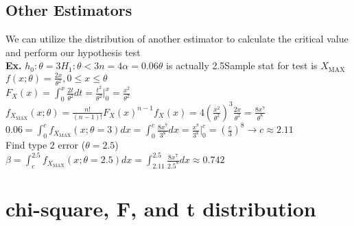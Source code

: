 \documentclass{article}
\begin{document}
\subsection{Other Estimators}
\label{sec:hother}
We can utilize the distribution of another estimator to calculate the critical value and perform our hypothesis test\\
\textbf{Ex.} $h_0:\theta=3$\hspace*{0.2in}$H_1:\theta<3$\hspace*{0.2in}$n=4$\hspace*{0.2in}$\alpha=0.06$\hspace*{0.2in}$\theta$ is actually 2.5\hspace*{0.2in}Sample stat for test is $X_{\text{MAX}}$\\
$f(x;\theta)=\frac{2x}{\theta^2},0\leq x\leq \theta$\\
$F_X(x)=\int_0^x\frac{2t}{\theta^2}dt=\frac{t^2}{\theta^2}\big \vert_0^x=\frac{x^2}{\theta^2}$\\
$f_{X_\text{MAX}}(x;\theta)=\frac{n!}{(n-1)!}F_X(x)^{n-1}f_X(x)=4(\frac{x^2}{\theta^2})^3\frac{2x}{\theta^2}=\frac{8x^7}{\theta^8}$\\
$0.06=\int_0^cf_{X_\text{MAX}}(x;\theta=3)dx=\int_0^c\frac{8x^7}{3^8}dx=\frac{x^8}{3^8}\big\vert_0^c=(\frac{c}{3})^8\rightarrow c\approx 2.11$\\
Find type 2 error ($\theta=2.5$)\\
$\beta=\int_c^{2.5}f_{X_\text{MAX}}(x;\theta=2.5)dx=\int_{2.11}^{2.5}\frac{8x^7}{2.5^8}dx\approx0.742$
\section{chi-square, F, and t distribution}
\label{sec:cft}
\end{document}
